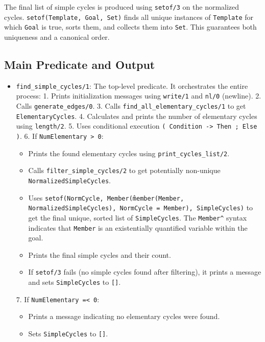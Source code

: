 \documentclass[12pt,a4paper]{article}
\begin{document}
The final list of simple cycles is produced using \texttt{setof/3} on the normalized cycles. \texttt{setof(Template, Goal, Set)} finds all unique instances of \texttt{Template} for which \texttt{Goal} is true, sorts them, and collects them into \texttt{Set}. This guarantees both uniqueness and a canonical order.

\subsection{Main Predicate and Output}
\begin{itemize}
    \item \texttt{find\_simple\_cycles/1}: The top-level predicate. It orchestrates the entire process:
        1. Prints initialization messages using \texttt{write/1} and \texttt{nl/0} (newline).
        2. Calls \texttt{generate\_edges/0}.
        3. Calls \texttt{find\_all\_elementary\_cycles/1} to get \texttt{ElementaryCycles}.
        4. Calculates and prints the number of elementary cycles using \texttt{length/2}.
        5. Uses conditional execution \texttt{( Condition -> Then ; Else )}.
        6. If \texttt{NumElementary > 0}:
            \begin{itemize}
                \item Prints the found elementary cycles using \texttt{print\_cycles\_list/2}.
                \item Calls \texttt{filter\_simple\_cycles/2} to get potentially non-unique \texttt{NormalizedSimpleCycles}.
                \item Uses \texttt{setof(NormCycle, Member\^(member(Member, NormalizedSimpleCycles), NormCycle = Member), SimpleCycles)} to get the final unique, sorted list of \texttt{SimpleCycles}. The \texttt{Member\^} syntax indicates that \texttt{Member} is an existentially quantified variable within the goal.
                \item Prints the final simple cycles and their count.
                \item If \texttt{setof/3} fails (no simple cycles found after filtering), it prints a message and sets \texttt{SimpleCycles} to \texttt{[]}.
            \end{itemize}
        7. If \texttt{NumElementary =< 0}:
            \begin{itemize}
                \item Prints a message indicating no elementary cycles were found.
                \item Sets \texttt{SimpleCycles} to \texttt{[]}.

\end{itemize}
\end{itemize}
\end{document}
